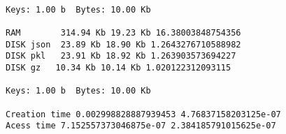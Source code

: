 \documentclass[11pt]{article}
\begin{document}
    \begin{Verbatim}[commandchars=\\\{\}]

Keys: 1.00 b  Bytes: 10.00 Kb

RAM        314.94 Kb 19.23 Kb 16.38003848754356
DISK json  23.89 Kb 18.90 Kb 1.2643276710588982
DISK pkl   23.91 Kb 18.92 Kb 1.263903573694227
DISK gz   10.34 Kb 10.14 Kb 1.020122312093115

Keys: 1.00 b  Bytes: 10.00 Kb

Creation time 0.002998828887939453 4.76837158203125e-07
Acess time 7.152557373046875e-07 2.384185791015625e-07
    \end{Verbatim}


    
    
    
\end{document}
